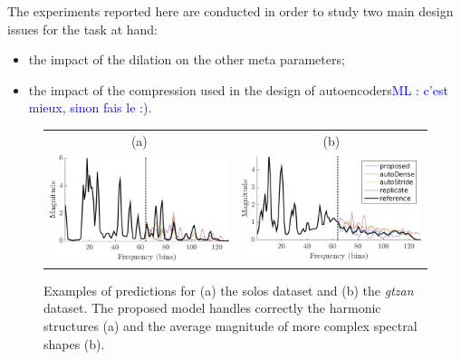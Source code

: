 \documentclass{article}
\newcommand{\ml}[1]{\textcolor{blue}{ML : #1}}
\begin{document}
The experiments reported here are conducted in order to study two main design issues for the task at hand:
\begin{itemize}
  \item the impact of the dilation on the other meta parameters;
  \item the impact of the compression used in the design of autoencoders\ml{c'est mieux, sinon fais le :)}.
\end{itemize}


\begin{figure}[t]
\center
\begin{tabular}{cc}
  (a) & (b) \\
  \includegraphics[width = .95\columnwidth]{figures/solos_1141.png}
&
  \includegraphics[width = .95\columnwidth]{figures/gtzan_1120.png}
\end{tabular}
\caption{Examples of predictions for (a) the solos dataset and (b) the \textit{gtzan} dataset. The proposed model handles correctly the harmonic structures (a) and the average magnitude of more complex spectral shapes (b).}
\label{fig:spec}
\end{figure}
\end{document}
